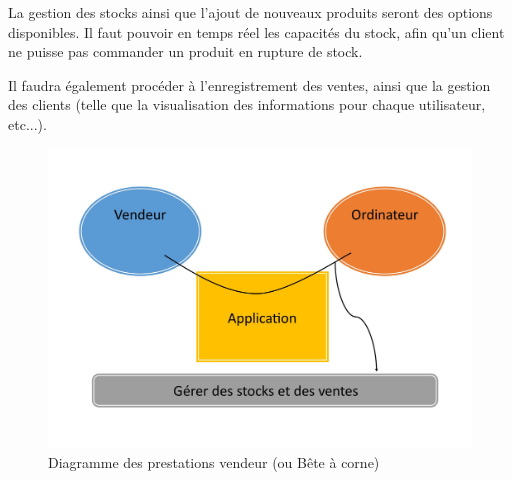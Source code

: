 \documentclass[a4paper]{article}
\begin{document}
		La gestion des stocks ainsi que l'ajout de nouveaux produits seront des options disponibles. Il faut pouvoir en temps réel les capacités du stock, afin qu'un client ne puisse pas commander un produit en rupture de stock.
		
		Il faudra également procéder à l'enregistrement des ventes, ainsi que la gestion des clients (telle que la visualisation des informations pour chaque utilisateur, etc...).
	
	\begin{figure}[!t]
		\centering
			\includegraphics[scale=0.5]{../graph/beteACorne2.jpg}
			\caption{Diagramme des prestations vendeur (ou Bête à corne)}
	\end{figure}
	
	\newpage
	~ 
	\newpage
\end{document}
